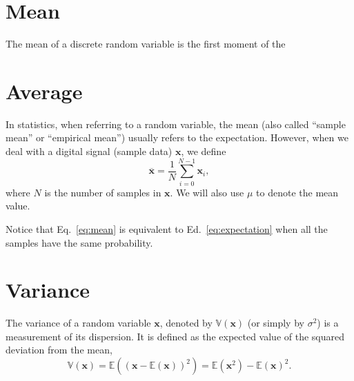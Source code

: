 \section{Mean}
\label{sec:mean}
The mean of a discrete random variable is the first moment of the  

\section{Average}
\label{sec:average}
In statistics, when referring to a random variable, the mean (also
called ``sample mean'' or ``empirical mean'') usually refers to the
expectation. However, when we deal with a digital signal (sample data)
$\mathbf{x}$, we define
\begin{equation}
  \overline{\mathbf{x}} = \frac{1}{N}\sum_{i=0}^{N-1}\mathbf{x}_i,
  \label{eq:mean}
\end{equation}
where $N$ is the number of samples in $\mathbf{x}$. We will also use
$\mu$ to denote the mean value.

Notice that Eq.~\ref{eq:mean} is equivalent to
Ed.~\ref{eq:expectation} when all the samples have the same
probability.


\section{Variance}
\label{sec:variance}

The variance of a random variable $\mathbf{x}$, denoted by
$\mathbb{V}(\mathbf{x})$ (or simply by $\sigma^2$) is a measurement of
its dispersion. It is defined as the expected value of the squared
deviation from the mean,
\begin{equation}
  \mathbb{V}(\mathbf{x}) = \mathbb{E}\left((\mathbf{x} - \mathbb{E}(\mathbf{x}))^2 \right) = \mathbb{E}(\mathbf{x}^2)-\mathbb{E}(\mathbf{x})^2.
  \label{eq:variance}
\end{equation}



